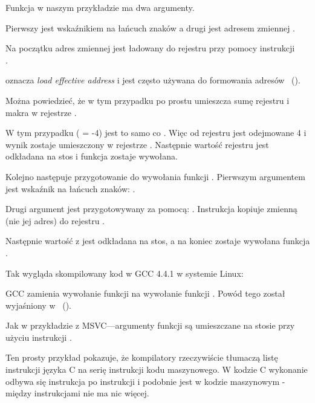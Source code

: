 Funkcja \scanf w naszym przykładzie ma dwa argumenty.

Pierwszy jest wskaźnikiem na łańcuch znaków  a drugi jest adresem zmiennej .

Na początku adres zmiennej  jest ładowany do rejestru \EAX przy pomocy instrukcji \\
.

\LEA oznacza \emph{load effective address} i jest często używana do formowania adresów ~().

Można powiedzieć, że w tym przypadku \LEA po prostu umieszcza sumę rejestru \EBP i makra  w rejestrze \EAX.

W tym przypadku ( = -4) jest to samo co . Więc od rejestru \EBP jest odejmowane 4 i wynik zostaje umieszczony w rejestrze \EAX.
Następnie wartość rejestru \EAX jest odkładana na stos i funkcja \scanf zostaje wywołana.

Kolejno następuje przygotowanie do wywołania funkcji \printf. Pierwszym argumentem jest wskaźnik na łańcuch znaków:
.

Drugi argument jest przygotowywany za pomocą: .
Instrukcja kopiuje zmienną  (nie jej adres) do rejestru \ECX.

Następnie wartość z \ECX jest odkładana na stos, a na koniec zostaje wywołana funkcja  \printf.




Tak wygląda skompilowany kod w GCC 4.4.1 w systemie Linux:



GCC zamienia wywołanie funkcji \printf na wywołanie funkcji \puts. Powód tego został wyjaśniony w ~().

% 

Jak w przykładzie z MSVC---argumenty funkcji są umieszczane na stosie przy użyciu instrukcji \MOV.


Ten prosty przykład pokazuje, że kompilatory rzeczywiście tłumaczą listę instrukcji języka C na serię instrukcji kodu maszynowego.
W kodzie C wykonanie odbywa się instrukcja po instrukcji i podobnie jest w kodzie maszynowym - między instrukcjami nie ma nic więcej.
